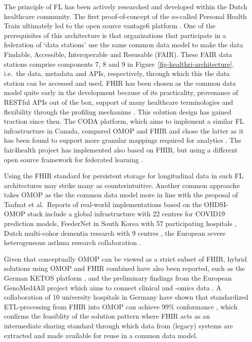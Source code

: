 \documentclass[
  authoryear]{elsarticle}
\begin{document}
The principle of FL has been actively researched and developed within
the Dutch healthcare community. The first proof-of-concept of the
so-called Personal Health Train \citep{vansoest2018using} ultimately led
to the open source vantage6 platform \citep{smits2022improved}. One of
the prerequisites of this architecture is that organizations that
participate in a federation of `data stations' use the same common data
model to make the data Findable, Accessible, Interoperable and Resusable
(FAIR). These FAIR data stations comprise components 7, 8 and 9 in
Figure~\ref{fig-healthri-architecture}, i.e.~the data, metadata and
APIs, respectively, through which this the data station can be accessed
and used. FHIR has been chosen as the common data model quite early in
the development because of its practicality, provenance of RESTful APIs
out of the box, support of many healthcare terminologies and flexibility
through the profiling mechanims \citep{choudhury2020personal}. This
solution design has gained traction since then. The CODA platform, which
aims to implement a similar FL infrastructure in Canada, compared OMOP
and FHIR and chose the latter as it has been found to support more
granular mappings required for analytics \citep{mullie2023coda}. The
fair4health project has implemented also based on FHIR, but using a
different open source framework for federated learning
\citep{sinacoi2024privacypreserving}.

Using the FHIR standard for persistent storage for longitudinal data in
such FL architectures may strike many as counterintuitive. Another
common approache takes OMOP as the the common data model more in line
with the proposal of Tsafnat et al.~Reports of real-world
implementations based on the OHDSI-OMOP stack include a global
infrastructure with 22 centres for COVID19 prediction
models\citep{khalid2021standardized}, FeederNet in South Korea with 57
participating hospitals \citep{lee2022feedernet}, Dutch multi-cohor
dementia research with 9 centres \citep{mateus2024data}, the European
severe heterogeneous asthma research collaboration
\citep{kroes2022blueprint}.

Given that conceptually OMOP can be viewed as a strict subset of FHIR,
hybrid solutions using OMOP and FHIR combined have also been reported,
such as the German KETOS platform \citep{gruendner2019ketos}, and the
preliminary findings from the European GenoMed4All project which aims to
connect clinical and -omics data \citep{cremonesi2023need}. A
collaboration of 10 university hospitals in Germany have shown that
standardized ETL-processing from FHIR into OMOP can achieve 99\%
conformance \citep{peng2023etlprocess}, which confirms the feasiblity of
the solution pattern where FHIR acts as an intermediate sharing standard
through which data from (legacy) systems are extracted and made
available for reuse in a common data model.
\end{document}
